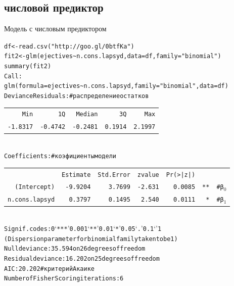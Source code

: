 \subsection{числовой предиктор}
\begin{frame}{Модель с числовым предиктором}
\vspace{-5mm}
\scriptsize
\begin{alltt}
df <- read.csv("http://goo.gl/0btfKa")\\
fit2 <- \alert{glm(ejectives \textasciitilde n.cons.lapsyd}, data = df, \alert{family = "binomial")} \\
summary(fit2)\medskip\\
Call:\\
glm(formula = ejectives \textasciitilde n.cons.lapsyd, family = "binomial"{},  data = df)\medskip\\
Deviance Residuals: \hfill \# \alert{распределение остатков} \\
\begin{tabular}{rrrrr}
    Min   &    1Q &  Median  &     3Q &     Max  \\
-1.8317  & -0.4742 &  -0.2481 &  0.1914  & 2.1997 \\
\end{tabular}
\medskip\\
Coefficients: \hfill \# \alert{коэфициенты модели}\\
\begin{tabular}{rrrrrrr}
    &       \alert{Estimate} & Std. Error & z value & Pr(>|z|)& &\\
\alert{(Intercept)} &  \alert{-9.9204}  &  3.7699 &  -2.631   & 0.0085 &**&\hfill \# \alert{β$_0$}\\
\alert{n.cons.lapsyd}  & \alert{0.3797} &  0.1495  &  2.540 &  0.0111 & * & \hfill \# \alert{β$_1$}
\end{tabular} \medskip\\
Signif. codes:  0 ‘***’ 0.001 ‘**’ 0.01 ‘*’ 0.05 ‘.’ 0.1 ‘ ’ 1 \medskip\\
(Dispersion parameter for binomial family taken to be 1) \medskip\\
Null deviance: 35.594  on 26  degrees of freedom\\
Residual deviance: 16.202  on 25  degrees of freedom\\
AIC: 20.202 \hfill \# \alert{критерий Акаике}\medskip\\
Number of Fisher Scoring iterations: 6
\end{alltt}
\normalsize
\end{frame}
